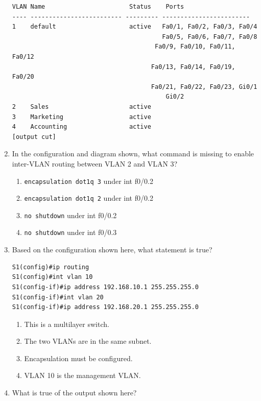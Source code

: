 \begin{enumerate}
\begin{verbatim}
VLAN Name                       Status    Ports
---- ------------------------- --------- ------------------------
1    default                    active   Fa0/1, Fa0/2, Fa0/3, Fa0/4
                                         Fa0/5, Fa0/6, Fa0/7, Fa0/8
                                       Fa0/9, Fa0/10, Fa0/11, Fa0/12
                                      Fa0/13, Fa0/14, Fa0/19, Fa0/20
                                      Fa0/21, Fa0/22, Fa0/23, Gi0/1
                                          Gi0/2
2    Sales                      active
3    Marketing                  active
4    Accounting                 active
[output cut]
\end{verbatim}
\item
  In the configuration and diagram shown, what command is missing to
  enable inter-VLAN routing between VLAN 2 and VLAN 3?

  \begin{figure}
  \centering
  \caption{}
  \end{figure}

  \begin{enumerate}
  \tightlist
  \item
    \texttt{encapsulation\ dot1q\ 3} under int f0/0.2
  \item
    \texttt{encapsulation\ dot1q\ 2} under int f0/0.2
  \item
    \texttt{no\ shutdown} under int f0/0.2
  \item
    \texttt{no\ shutdown} under int f0/0.3
  \end{enumerate}
\item
   Based on the
  configuration shown here, what statement is true?

\begin{verbatim}
S1(config)#ip routing
S1(config)#int vlan 10
S1(config-if)#ip address 192.168.10.1 255.255.255.0
S1(config-if)#int vlan 20
S1(config-if)#ip address 192.168.20.1 255.255.255.0
\end{verbatim}

  \begin{enumerate}
  \tightlist
  \item
    This is a multilayer switch.
  \item
    The two VLANs are in the same subnet.
  \item
    Encapsulation must be configured.
  \item
    VLAN 10 is the management VLAN.
  \end{enumerate}
\item
  What is true of the output shown here?


\end{enumerate}
